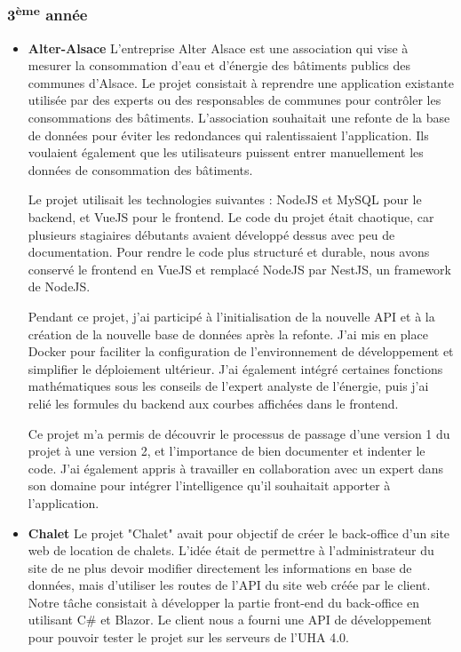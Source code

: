 \documentclass[12pt]{article}
\begin{document}
\subsubsection{3\textsuperscript{ème} année}
\begin{itemize}
    \item  \textbf{Alter-Alsace}
        \newline L'entreprise Alter Alsace est une association qui vise à mesurer la consommation d'eau et d'énergie des bâtiments publics des communes d'Alsace. Le projet consistait à reprendre une application existante utilisée par des experts ou des responsables de communes pour contrôler les consommations des bâtiments. L'association souhaitait une refonte de la base de données pour éviter les redondances qui ralentissaient l'application. Ils voulaient également que les utilisateurs puissent entrer manuellement les données de consommation des bâtiments.

         \newline Le projet utilisait les technologies suivantes : NodeJS et MySQL pour le backend, et VueJS pour le frontend. Le code du projet était chaotique, car plusieurs stagiaires débutants avaient développé dessus avec peu de documentation. Pour rendre le code plus structuré et durable, nous avons conservé le frontend en VueJS et remplacé NodeJS par NestJS, un framework de NodeJS.

         \newline Pendant ce projet, j'ai participé à l'initialisation de la nouvelle API et à la création de la nouvelle base de données après la refonte. J'ai mis en place Docker pour faciliter la configuration de l'environnement de développement et simplifier le déploiement ultérieur. J'ai également intégré certaines fonctions mathématiques sous les conseils de l'expert analyste de l'énergie, puis j'ai relié les formules du backend aux courbes affichées dans le frontend.

        \newline Ce projet m'a permis de découvrir le processus de passage d'une version 1 du projet à une version 2, et l'importance de bien documenter et indenter le code. J'ai également appris à travailler en collaboration avec un expert dans son domaine pour intégrer l'intelligence qu'il souhaitait apporter à l'application.
    \item \textbf{Chalet}
         \newline Le projet "Chalet" avait pour objectif de créer le back-office d'un site web de location de chalets. L'idée était de permettre à l'administrateur du site de ne plus devoir modifier directement les informations en base de données, mais d'utiliser les routes de l'API du site web créée par le client. Notre tâche consistait à développer la partie front-end du back-office en utilisant C\# et Blazor. Le client nous a fourni une API de développement pour pouvoir tester le projet sur les serveurs de l'UHA 4.0.


\end{itemize}
\end{document}

